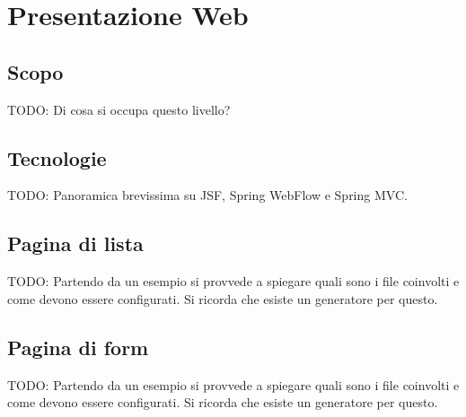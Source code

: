 \chapter{Presentazione Web}

\section{Scopo}
TODO: Di cosa si occupa questo livello?

\section{Tecnologie}
TODO: Panoramica brevissima su JSF, Spring WebFlow e Spring MVC.

\section{Pagina di lista}
TODO: Partendo da un esempio si provvede a spiegare quali sono i file coinvolti e come devono essere configurati. Si ricorda che esiste un generatore per questo.

\section{Pagina di form}
TODO: Partendo da un esempio si provvede a spiegare quali sono i file coinvolti e come devono essere configurati. Si ricorda che esiste un generatore per questo.
